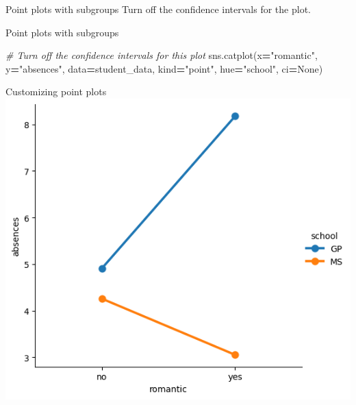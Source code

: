\documentclass[
  ignorenonframetext,
]{beamer}
\newenvironment{Shaded}{\begin{snugshade}}{\end{snugshade}}
\newcommand{\CommentTok}[1]{\textcolor[rgb]{0.56,0.35,0.01}{\textit{#1}}}
\newcommand{\NormalTok}[1]{#1}
\newcommand{\OperatorTok}[1]{\textcolor[rgb]{0.81,0.36,0.00}{\textbf{#1}}}
\newcommand{\StringTok}[1]{\textcolor[rgb]{0.31,0.60,0.02}{#1}}
\newcommand{\VariableTok}[1]{\textcolor[rgb]{0.00,0.00,0.00}{#1}}
\begin{document}
\begin{frame}{Point plots with subgroups}
\label{point-plots-with-subgroups-6}
Turn off the confidence intervals for the plot.
\end{frame}

\begin{frame}[fragile]{Point plots with subgroups}
\label{point-plots-with-subgroups-7}

\begin{Shaded}
\begin{Highlighting}[]
\CommentTok{\# Turn off the confidence intervals for this plot}
\NormalTok{sns.catplot(x}\OperatorTok{=}\StringTok{"romantic"}\NormalTok{, y}\OperatorTok{=}\StringTok{"absences"}\NormalTok{,}
\NormalTok{            data}\OperatorTok{=}\NormalTok{student\_data,}
\NormalTok{            kind}\OperatorTok{=}\StringTok{"point"}\NormalTok{,}
\NormalTok{            hue}\OperatorTok{=}\StringTok{"school"}\NormalTok{,}
\NormalTok{            ci}\OperatorTok{=}\VariableTok{None}\NormalTok{)}
\end{Highlighting}
\end{Shaded}
\end{frame}

\begin{frame}{Customizing point plots}
\label{customizing-point-plots-12}
\includegraphics{../images/im294.png}
\end{frame}
\end{document}
